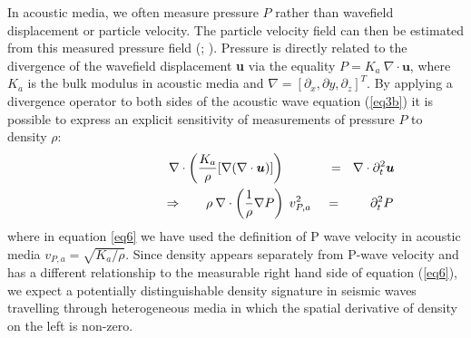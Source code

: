 \documentclass[]{article}
\begin{document}
	In acoustic media, we often measure pressure $P$ rather than wavefield displacement or particle velocity. The particle velocity field can then be estimated from this measured pressure field (\cite{robertsson2002rough}; \cite{amundsen2005rough}). Pressure is directly related to the divergence of the wavefield displacement \textbf{u} via the equality $P = K_{a} \: \nabla \cdot \bm{u} $, where $K_{a}$ is the bulk modulus in acoustic media and $\nabla = [\partial_{x},\partial{y},\partial_{z}]^{T}$. By applying a divergence operator to both sides of the acoustic wave equation (\ref{eq3b}) it is possible to express an explicit sensitivity of measurements of pressure $P$ to density $\rho$:
	\begin{align}
		\shoveright  \shoveright  \shoveright  \shoveright \shoveright \shoveright  \shoveright  				   
		\: \nabla& \cdot \bigg(\frac{K_{a}}{\rho} [\nabla (\nabla \cdot \bm{u})] \bigg)   \: \:\:\:\:\:\: \:\:\:\: \:\: \: \: \: = \: \: \:\nabla \cdot \partial_{t}^{2} \bm{u}  \label{eq4} \\
		\Rightarrow& \:\:\: \quad  \:\: \rho \: \nabla \cdot \bigg( \frac{1}{\rho} \nabla P \bigg) \: \: v_{P,a}^{2} \:\:\:\: \:  = \: \: \: \: \: \: \: \: \: \: \partial_{t}^{2} P  \label{eq6}
	\end{align}
	where in equation \eqref{eq6} we have used the definition of P wave velocity in acoustic media $v_{P,a} = \sqrt{K_{a}/\rho}$. Since density appears separately from P-wave velocity and has a different relationship to the measurable right hand side of equation (\ref{eq6}), we expect a potentially distinguishable density signature in seismic waves travelling through heterogeneous media in which the spatial derivative of density on the left is non-zero.\\
	
	
\end{document}
